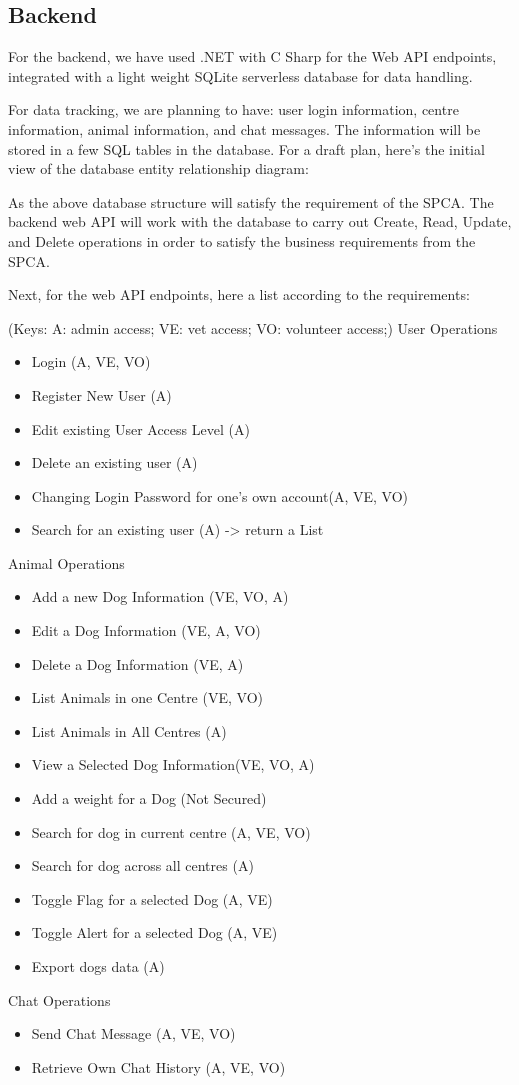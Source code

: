 \subsection{Backend}
For the backend, we have used .NET with C Sharp for the Web API endpoints, integrated with a light weight SQLite serverless database for data handling. 

For data tracking, we are planning to have: user login information, centre information, animal information, and chat messages. The information will be stored in a few SQL tables in the database. For a draft plan, here's the initial view of the database entity relationship diagram:

As the above database structure will satisfy the requirement of the SPCA. The backend web API will work with the database to carry out Create, Read, Update, and Delete operations in order to satisfy the business requirements from the SPCA.

Next, for the web API endpoints, here a list according to the requirements:

(Keys: A: admin access; VE: vet access; VO: volunteer access;)
User Operations
\begin{itemize}
  \item Login (A, VE, VO)
  \item Register New User (A)
  \item Edit existing User Access Level (A)
  \item Delete an existing user (A)
  \item Changing Login Password for one's own account(A, VE, VO)
  \item Search for an existing user (A) -> return a List
 \end{itemize}
 Animal Operations
 \begin{itemize}
  \item Add a new Dog Information (VE, VO, A)
  \item Edit a Dog Information (VE, A, VO)
  \item Delete a Dog Information (VE, A)
  \item List Animals in one Centre (VE, VO)
  \item List Animals in All Centres (A)
  \item View a Selected Dog Information(VE, VO, A)
  \item Add a weight for a Dog (Not Secured)
  \item Search for dog in current centre (A, VE, VO)
  \item Search for dog across all centres (A) 
  \item Toggle Flag for a selected Dog (A, VE)
  \item Toggle Alert for a selected Dog (A, VE)
  \item Export dogs data (A)
 \end{itemize}
 Chat Operations
 \begin{itemize}
  \item Send Chat Message (A, VE, VO)
  \item Retrieve Own Chat History (A, VE, VO) 
 \end{itemize}

